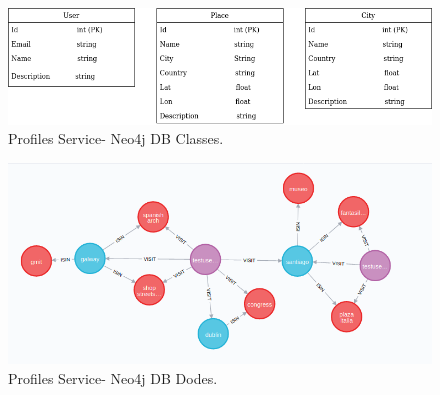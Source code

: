 \begin{figure}
	\begin{center}
		\includegraphics[width=120mm,scale=1]{img/profiles/profile-uml.png}
		\caption{Profiles Service- Neo4j DB Classes.}
		\label{profiles:dbuml}
	\end{center}
\end{figure}

\begin{figure}
	\begin{center}
		\includegraphics[width=120mm,scale=1]{img/profiles/neo4j-nodes.png}
		\caption{Profiles Service- Neo4j DB Dodes.}
		\label{profiles:dbnodes}
	\end{center}
\end{figure}
